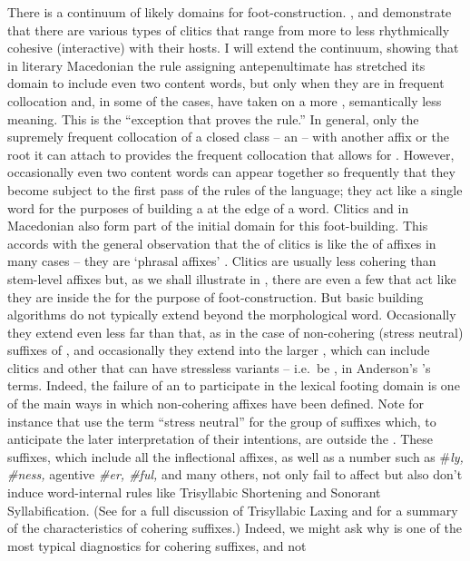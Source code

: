 \documentclass[output=paper,
modfonts
]{LSP/langsci}
\begin{document}
There is a continuum of likely domains for foot-construction. \citet{selkirk1995}, \citet{peperkamp1997} and \citet{anderson2011} demonstrate that there are various types of clitics that range from more to less rhythmically cohesive (interactive) with their hosts. I will extend the continuum, showing that in literary Macedonian \citep{lunt1952,franks1987,franks1989} the  rule assigning antepenultimate  has stretched its domain to include even two content words, but only when they are in frequent collocation and, in some of the cases, have taken on a more , semantically less  meaning. This is the “exception that proves the rule.” In general, only the supremely frequent collocation of a closed class  -- an  -- with another affix or the root it can attach to provides the frequent collocation that allows for . However, occasionally even two content words can appear together so frequently that they become subject to the first pass of the  rules of the language; they act like a single word for the purposes of building a  at the edge of a word. Clitics and  in Macedonian also form part of the initial domain for this foot-building. This accords with the general observation that the  of clitics is like the  of affixes in many cases -- they are ‘phrasal affixes’ \citep{anderson1992}. Clitics are usually less cohering than stem-level affixes but, as we shall illustrate in , there are even a few that act like they are inside the  for the purpose of foot-construction. But basic  building algorithms do not typically extend beyond the morphological word. Occasionally they extend even less far than that, as in the case of non-cohering (stress neutral) suffixes of , and occasionally they extend into the larger , which can include clitics and other  that can have stressless variants  -- i.e.\ be , in Anderson’s \citeyearpar{anderson2011}’s terms. Indeed, the failure of an  to participate in the lexical footing domain is one of the main ways in which non-cohering affixes have been defined. Note for instance that \citet[84ff]{chomskyhalle1968} use the term “stress neutral” for the group of suffixes which, to anticipate the later interpretation of their intentions, are outside the . These suffixes, which include all the inflectional affixes, as well as a number  such as \#\textit{ly, \#ness,} agentive \textit{\#er, \#ful,} and many others, not only fail to affect  but also don’t induce word-internal rules like Trisyllabic Shortening and Sonorant Syllabification. (See \citealt{kiparsky1982b} for a full discussion of Trisyllabic Laxing and \citealt{kaisse2005} for a summary of the characteristics of  cohering suffixes.) Indeed, we might ask why  is one of the most typical diagnostics for cohering suffixes, and not 
\end{document}

